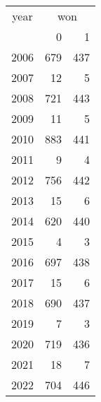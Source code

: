 \footnotesize\begin{tabular}[t]{lrr}
\toprule
\multicolumn{1}{c}{year} & \multicolumn{2}{c}{won} \\
\cmidrule(l{3pt}r{3pt}){1-1} \cmidrule(l{3pt}r{3pt}){2-3}
  & 0 & 1\\
\midrule
2006 & 679 & 437\\
2007 & 12 & 5\\
2008 & 721 & 443\\
2009 & 11 & 5\\
2010 & 883 & 441\\
2011 & 9 & 4\\
2012 & 756 & 442\\
2013 & 15 & 6\\
2014 & 620 & 440\\
2015 & 4 & 3\\
2016 & 697 & 438\\
2017 & 15 & 6\\
2018 & 690 & 437\\
2019 & 7 & 3\\
2020 & 719 & 436\\
2021 & 18 & 7\\
2022 & 704 & 446\\
\bottomrule
\end{tabular}
